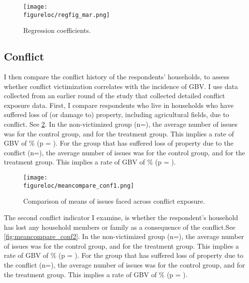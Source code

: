 \documentclass[11pt,a4paper]{scrartcl} %
\newcommand{\figureloc}{C:/Users/Koen/Dropbox/PhD/Papers/CongoGBV/Figures}
\begin{document}
\begin{figure}[H]
  \texttt{[image: \\figureloc/regfig\_mar.png]}
  \caption{Regression coefficients.}
  \label{fig:regfig_mar}
\end{figure}

\subsection*{Conflict}
I then compare the conflict history of the respondents' households, to assess whether conflict victimization correlates with the incidence of GBV. I use data collected from an earlier round of the study that collected detailed conflict exposure data. First, I compare respondents who live in households who have suffered loss of (or damage to) property, including agricultural fields, due to conflict. See \ref{fig:meancompare_conf1}. In the non-victimized group (n=), the average number of issues was  for the control group, and  for the treatment group. This implies a rate of GBV of \% (p = ). For the group that has suffered loss of property due to the conflict (n=), the average number of issues was  for the control group, and  for the treatment group. This implies a rate of GBV of \% (p = ).

\begin{figure}[H]
  \texttt{[image: \\figureloc/meancompare\_conf1.png]}
  \caption{Comparison of means of issues faced across conflict exposure.}
  \label{fig:meancompare_conf1}
\end{figure}

The second conflict indicator I examine, is whether the respondent's household has lost any household members or family as a consequence of the conflict.See \ref{fig:meancompare_conf2}. In the non-victimized group (n=), the average number of issues was  for the control group, and  for the treatment group. This implies a rate of GBV of \% (p = ). For the group that has suffered loss of property due to the conflict (n=), the average number of issues was  for the control group, and  for the treatment group. This implies a rate of GBV of \% (p = ).
\end{document}
